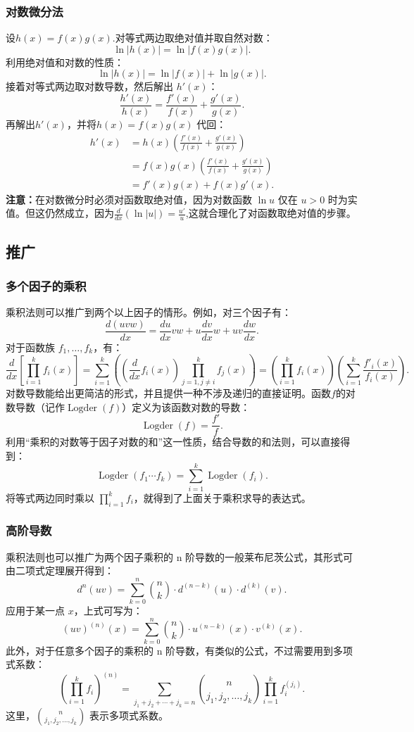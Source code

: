 \subsubsection{对数微分法}
设$h(x) = f(x)g(x)$.对等式两边取绝对值并取自然对数：
$$
\ln |h(x)| = \ln |f(x)g(x)|.~
$$
利用绝对值和对数的性质：
$$
\ln |h(x)| = \ln |f(x)| + \ln |g(x)|.~
$$
接着对等式两边取对数导数，然后解出 $h'(x)$：
$$
\frac{h'(x)}{h(x)} = \frac{f'(x)}{f(x)} + \frac{g'(x)}{g(x)}.~
$$
再解出$h'(x)$，并将$h(x)=f(x)g(x)$ 代回：
$$
\begin{aligned}
h'(x) &= h(x)\left(\frac{f'(x)}{f(x)} + \frac{g'(x)}{g(x)}\right) \\
&= f(x)g(x)\left(\frac{f'(x)}{f(x)} + \frac{g'(x)}{g(x)}\right) \\
&= f'(x)g(x) + f(x)g'(x).
\end{aligned}~
$$
\textbf{注意：}在对数微分时必须对函数取绝对值，因为对数函数 $\ln u$ 仅在 $u > 0$ 时为实值。但这仍然成立，因为$\frac{d}{dx}(\ln |u|) = \frac{u'}{u}$,这就合理化了对函数取绝对值的步骤。
\subsection{推广}
\subsubsection{多个因子的乘积}
乘积法则可以推广到两个以上因子的情形。例如，对三个因子有：
$$
\frac{d(uvw)}{dx} = \frac{du}{dx}vw + u\frac{dv}{dx}w + uv\frac{dw}{dx}.~
$$
对于函数族 $f_{1}, \dots , f_{k}$，有：
$$
\frac{d}{dx}\left[\prod_{i=1}^{k} f_{i}(x)\right] 
= \sum_{i=1}^{k}\left(\left(\frac{d}{dx}f_{i}(x)\right)\prod_{j=1, j\neq i}^{k} f_{j}(x)\right) 
= \left(\prod_{i=1}^{k} f_{i}(x)\right)\left(\sum_{i=1}^{k}\frac{f'_{i}(x)}{f_{i}(x)}\right).~
$$
对数导数能给出更简洁的形式，并且提供一种不涉及递归的直接证明。函数$f$的对数导数（记作$\operatorname{Logder}(f)$）定义为该函数对数的导数：
$$
\operatorname{Logder}(f) = \frac{f'}{f}.~
$$
利用“乘积的对数等于因子对数的和”这一性质，结合导数的和法则，可以直接得到：
$$
\operatorname{Logder}(f_{1}\cdots f_{k}) = \sum_{i=1}^{k}\operatorname{Logder}(f_{i}).~
$$
将等式两边同时乘以 $\prod_{i=1}^{k} f_{i}$，就得到了上面关于乘积求导的表达式。
\subsubsection{高阶导数}
乘积法则也可以推广为两个因子乘积的 n 阶导数的一般莱布尼茨公式，其形式可由二项式定理展开得到：
$$
d^{n}(uv) = \sum_{k=0}^{n} {n \choose k} \cdot d^{(n-k)}(u) \cdot d^{(k)}(v).~
$$
应用于某一点 $x$，上式可写为：
$$
(uv)^{(n)}(x) = \sum_{k=0}^{n} {n \choose k} \cdot u^{(n-k)}(x) \cdot v^{(k)}(x).~
$$
此外，对于任意多个因子的乘积的 n 阶导数，有类似的公式，不过需要用到多项式系数：
$$
\left(\prod_{i=1}^{k} f_{i}\right)^{(n)} 
= \sum_{j_{1}+j_{2}+\cdots+j_{k}=n} 
{n \choose j_{1}, j_{2}, \ldots, j_{k}} 
\prod_{i=1}^{k} f_{i}^{(j_{i})}.~
$$
这里，${n \choose j_{1}, j_{2}, \ldots, j_{k}}$ 表示多项式系数。 
